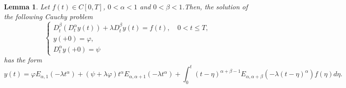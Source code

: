 \documentclass{amsart}
\numberwithin{equation}{section}
\newtheorem{lem}[thm]{Lemma}
\begin{document}
\begin{lem}\label{Lemma5}
 Let $f(t) \in C[0,T]$, $0<\alpha<1$ and $0<\beta<1$.Then, the  solution of the following Cauchy problem
\begin{equation}\label{eqaux}
    \begin{cases}
    D_t^\beta(D_t^\alpha y(t))+\lambda D_t^\beta y(t)=f(t),  \quad 0<t\leq T,\\
    y(+0)=\varphi,  \\
    D_t^\alpha y(+0)=\psi
    \end{cases}
\end{equation}   has the form
$$
     y(t)=\varphi E_{\alpha,1}(-\lambda t^\alpha)+(\psi+\lambda \varphi)t^\alpha E_{\alpha,\alpha+1}(-\lambda t^\alpha)+\int_0^t (t-\eta)^{\alpha+\beta-1} E_{\alpha,\alpha+\beta}(-\lambda (t-\eta)^\alpha)f(\eta) d\eta .
$$
\end{lem}
\end{document}
